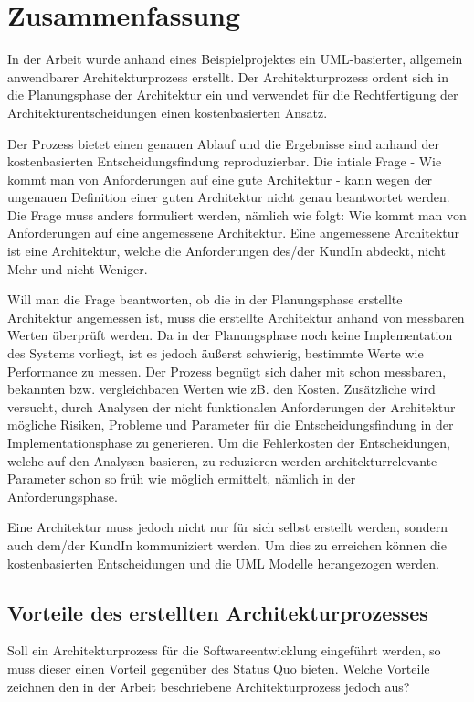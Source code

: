 \chapter{Zusammenfassung}
In der Arbeit wurde anhand eines Beispielprojektes ein UML-basierter, allgemein anwendbarer Architekturprozess erstellt. Der Architekturprozess ordent sich in die Planungsphase der Architektur ein und verwendet für die Rechtfertigung der Architekturentscheidungen einen kostenbasierten Ansatz.

Der Prozess bietet einen genauen Ablauf und die Ergebnisse sind anhand der kostenbasierten Entscheidungsfindung reproduzierbar. Die intiale Frage - Wie kommt man von Anforderungen auf eine gute Architektur - kann wegen der ungenauen Definition einer guten Architektur nicht genau beantwortet werden. Die Frage muss anders formuliert werden, nämlich wie folgt: Wie kommt man von Anforderungen auf eine angemessene Architektur. Eine angemessene Architektur ist eine Architektur, welche die Anforderungen des/der KundIn abdeckt, nicht Mehr und nicht Weniger.

Will man die Frage beantworten, ob die in der Planungsphase erstellte Architektur angemessen ist, muss die erstellte Architektur anhand von messbaren Werten überprüft werden. Da in der Planungsphase noch keine Implementation des Systems vorliegt, ist es jedoch äußerst schwierig, bestimmte Werte wie Performance zu messen. Der Prozess begnügt sich daher mit schon messbaren, bekannten bzw. vergleichbaren Werten wie zB. den Kosten. Zusätzliche wird versucht, durch Analysen der nicht funktionalen Anforderungen der Architektur mögliche Risiken, Probleme und Parameter für die Entscheidungsfindung in der Implementationsphase zu generieren. Um die Fehlerkosten der Entscheidungen, welche auf den Analysen basieren, zu reduzieren werden architekturrelevante Parameter schon so früh wie möglich ermittelt, nämlich in der Anforderungsphase.

Eine Architektur muss jedoch nicht nur für sich selbst erstellt werden, sondern auch dem/der KundIn kommuniziert werden. Um dies zu erreichen können die kostenbasierten Entscheidungen und die UML Modelle herangezogen werden.


\section{Vorteile des erstellten Architekturprozesses}
Soll ein Architekturprozess für die Softwareentwicklung eingeführt werden, so muss dieser einen Vorteil gegenüber des Status Quo bieten. Welche Vorteile zeichnen den in der Arbeit beschriebene Architekturprozess jedoch aus?

